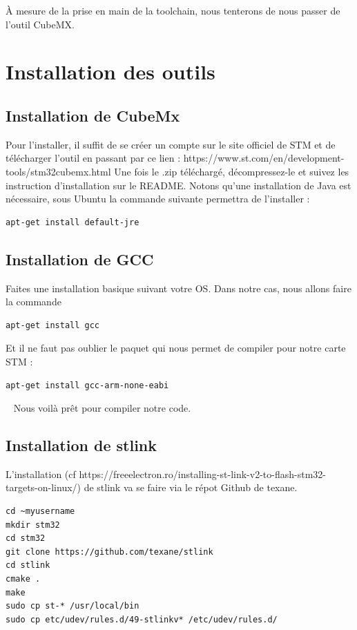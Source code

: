 \documentclass[11pt,french,a4paper]{report}
\begin{document}
À mesure de la prise en main de la toolchain, nous tenterons de nous passer de l'outil CubeMX. 

\chapter{Installation des outils}

\section{Installation de CubeMx}
Pour l'installer, il suffit de se créer un compte sur le site officiel de STM et de télécharger
l'outil en passant par ce lien : https://www.st.com/en/development-tools/stm32cubemx.html
Une fois le .zip téléchargé, décompressez-le et suivez les instruction d'installation sur le README.
Notons qu'une installation de Java est nécessaire, sous Ubuntu la commande suivante permettra de 
l'installer : 
\begin{verbatim}
apt-get install default-jre
\end{verbatim}

\section{Installation de GCC}
Faites une installation basique suivant votre OS. 
Dans notre cas, nous allons faire la commande 
\begin{verbatim}
apt-get install gcc
\end{verbatim}
Et il ne faut pas oublier le paquet qui nous permet de compiler pour notre carte STM : 
\begin{verbatim}
apt-get install gcc-arm-none-eabi
\end{verbatim} 
Nous voilà prêt pour compiler notre code.

\section{Installation de stlink}
L'installation (cf https://freeelectron.ro/installing-st-link-v2-to-flash-stm32-targets-on-linux/)  
de stlink va se faire via le répot Github de texane.
\begin{verbatim}
cd ~myusername
mkdir stm32
cd stm32
git clone https://github.com/texane/stlink
cd stlink
cmake .
make
sudo cp st-* /usr/local/bin
sudo cp etc/udev/rules.d/49-stlinkv* /etc/udev/rules.d/
\end{verbatim}
\end{document}
